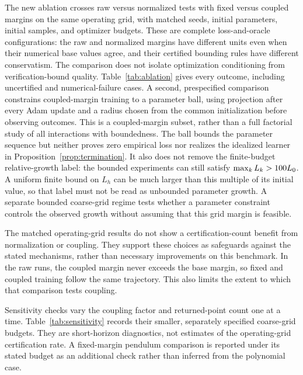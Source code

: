 \documentclass[12pt,onecolumn,journal]{IEEEtran}
\begin{document}
The new ablation crosses raw versus normalized tests with fixed versus coupled margins on the same operating grid, with matched seeds, initial parameters, initial samples, and optimizer budgets. These are complete loss-and-oracle configurations: the raw and normalized margins have different units even when their numerical base values agree, and their certified bounding rules have different conservatism. The comparison does not isolate optimization conditioning from verification-bound quality. Table~\ref{tab:ablation} gives every outcome, including uncertified and numerical-failure cases. A second, prespecified comparison constrains coupled-margin training to a parameter ball, using projection after every Adam update and a radius chosen from the common initialization before observing outcomes. \revBoundedRadius{} This is a coupled-margin subset, rather than a full factorial study of all interactions with boundedness. The ball bounds the parameter sequence but neither proves zero empirical loss nor realizes the idealized learner in Proposition~\ref{prop:termination}. It also does not remove the finite-budget relative-growth label: the bounded experiments can still satisfy $\max_kL_k>100 L_0$. A uniform finite bound on $L_h$ can be much larger than this multiple of its initial value, so that label must not be read as unbounded parameter growth. A separate bounded coarse-grid regime tests whether a parameter constraint controls the observed growth without assuming that this grid margin is feasible. \revAblationSummary

The matched operating-grid results do not show a certification-count benefit from normalization or coupling. They support these choices as safeguards against the stated mechanisms, rather than necessary improvements on this benchmark. In the raw runs, the coupled margin never exceeds the base margin, so fixed and coupled training follow the same trajectory. This also limits the extent to which that comparison tests coupling.

Sensitivity checks vary the coupling factor and returned-point count one at a time. Table~\ref{tab:sensitivity} records their smaller, separately specified coarse-grid budgets. \revSensitivitySettings{} They are short-horizon diagnostics, not estimates of the operating-grid certification rate. A fixed-margin pendulum comparison is reported under its stated budget as an additional check rather than inferred from the polynomial case.
\end{document}
